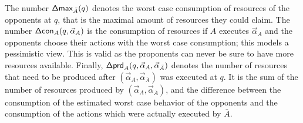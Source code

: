 \documentclass{llncs}
\begin{document}
The number $\mathsf{\Delta{}max}_{\bar A}(q)$ denotes the worst case consumption of resources of the opponents at $q$, that is the maximal amount of resources they could claim.  The number $\mathsf{\Delta{}con}_A(q,\vec{\alpha}_A)$ is the consumption of resources if $A$ executes $\vec{\alpha}_A$ and the opponents choose their actions with the worst case consumption; this models a pessimistic view. This is valid as the proponents can never be sure to have more resources available. Finally,  $\mathsf{\Delta{}prd}_A(q,\vec{\alpha}_A,\vec{\alpha}_{\bar{A}})$ denotes the number of resources that need to be produced after $(\vec{\alpha}_A,\vec{\alpha}_{\bar{A}})$ was executed at $q$. It is the sum of the number of resources produced by $(\vec{\alpha}_A,\vec{\alpha}_{\bar{A}})$,  and the difference between the consumption of the estimated worst case behavior of the opponents and the consumption of the actions which were actually executed by $\bar{A}$. 
\end{document}
